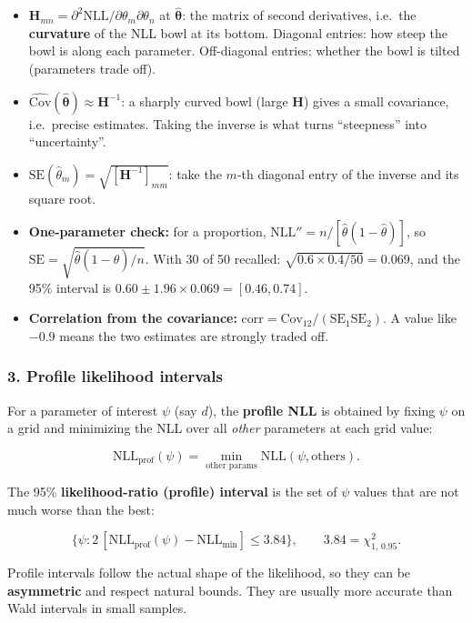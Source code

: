 \begin{itemize}
\tightlist
\item
  \(\mathbf{H}_{mn} = \partial^2 \mathrm{NLL}/\partial\theta_m\partial\theta_n\)
  at \(\hat{\boldsymbol\theta}\): the matrix of second derivatives,
  i.e.~the \textbf{curvature} of the NLL bowl at its bottom. Diagonal
  entries: how steep the bowl is along each parameter. Off-diagonal
  entries: whether the bowl is tilted (parameters trade off).
\item
  \(\widehat{\mathrm{Cov}}(\hat{\boldsymbol\theta}) \approx \mathbf{H}^{-1}\):
  a sharply curved bowl (large \(\mathbf{H}\)) gives a small covariance,
  i.e.~precise estimates. Taking the inverse is what turns ``steepness''
  into ``uncertainty''.
\item
  \(\mathrm{SE}(\hat\theta_m) = \sqrt{[\mathbf{H}^{-1}]_{mm}}\): take
  the \(m\)-th diagonal entry of the inverse and its square root.
\item
  \textbf{One-parameter check:} for a proportion,
  \(\mathrm{NLL}'' = n/[\hat\theta(1-\hat\theta)]\), so
  \(\mathrm{SE} = \sqrt{\hat\theta(1-\hat\theta)/n}\). With 30 of 50
  recalled: \(\sqrt{0.6 \times 0.4/50} = 0.069\), and the 95\% interval
  is \(0.60 \pm 1.96 \times 0.069 = [0.46, 0.74]\).
\item
  \textbf{Correlation from the covariance:}
  \(\mathrm{corr} = \mathrm{Cov}_{12}/(\mathrm{SE}_1\mathrm{SE}_2)\). A
  value like −0.9 means the two estimates are strongly traded off.
\end{itemize}

\subsubsection{3. Profile likelihood intervals}

For a parameter of interest \(\psi\) (say \(d\)), the \textbf{profile
NLL} is obtained by fixing \(\psi\) on a grid and minimizing the NLL
over all \emph{other} parameters at each grid value:

\[
\mathrm{NLL}_{\text{prof}}(\psi) = \min_{\text{other params}} \mathrm{NLL}(\psi, \text{others}).
\]

The 95\% \textbf{likelihood-ratio (profile) interval} is the set of
\(\psi\) values that are not much worse than the best:

\[
\big\{\psi : 2\,[\mathrm{NLL}_{\text{prof}}(\psi) - \mathrm{NLL}_{\min}] \le 3.84\big\}, \qquad 3.84 = \chi^2_{1,\,0.95}.
\]

Profile intervals follow the actual shape of the likelihood, so they can
be \textbf{asymmetric} and respect natural bounds. They are usually more
accurate than Wald intervals in small samples.

